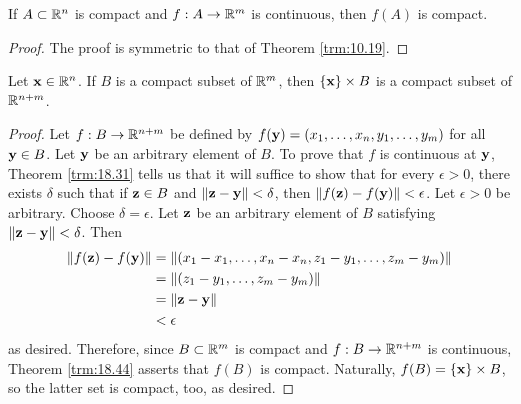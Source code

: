 \documentclass[../main.tex]{subfiles}
\begin{document}
\begin{theorem}\label{trm:18.44}
    If $A\subset\mathbb{R}^n$ is compact and $f:A\to\mathbb{R}^m$ is continuous, then $f(A)$ is compact.
    \begin{proof}
        The proof is symmetric to that of Theorem \ref{trm:10.19}.
    \end{proof}
\end{theorem}


\begin{corollary}\label{cly:18.45}
    Let $\mathbf{x}\in\mathbb{R}^n$. If $B$ is a compact subset of $\mathbb{R}^m$, then $\{\mathbf{x}\}\times B$ is a compact subset of $\mathbb{R}^{n+m}$.
    \begin{proof}
        Let $f:B\to\mathbb{R}^{n+m}$ be defined by $f(\mathbf{y})=(x_1,\dots,x_n,y_1,\dots,y_m)$ for all $\mathbf{y}\in B$. Let $\mathbf{y}$ be an arbitrary element of $B$. To prove that $f$ is continuous at $\mathbf{y}$, Theorem \ref{trm:18.31} tells us that it will suffice to show that for every $\epsilon>0$, there exists $\delta$ such that if $\mathbf{z}\in B$ and $\norm{\mathbf{z}-\mathbf{y}}<\delta$, then $\norm{f(\mathbf{z})-f(\mathbf{y})}<\epsilon$. Let $\epsilon>0$ be arbitrary. Choose $\delta=\epsilon$. Let $\mathbf{z}$ be an arbitrary element of $B$ satisfying $\norm{\mathbf{z}-\mathbf{y}}<\delta$. Then
        \begin{align*}
            \norm{f(\mathbf{z})-f(\mathbf{y})} &= \norm{(x_1-x_1,\dots,x_n-x_n,z_1-y_1,\dots,z_m-y_m)}\\
            &= \norm{(z_1-y_1,\dots,z_m-y_m)}\\
            &= \norm{\mathbf{z}-\mathbf{y}}\\
            &< \epsilon
        \end{align*}
        as desired. Therefore, since $B\subset\mathbb{R}^m$ is compact and $f:B\to\mathbb{R}^{n+m}$ is continuous, Theorem \ref{trm:18.44} asserts that $f(B)$ is compact. Naturally, $f(B)=\{\mathbf{x}\}\times B$, so the latter set is compact, too, as desired.
    \end{proof}
\end{corollary}
\end{document}

